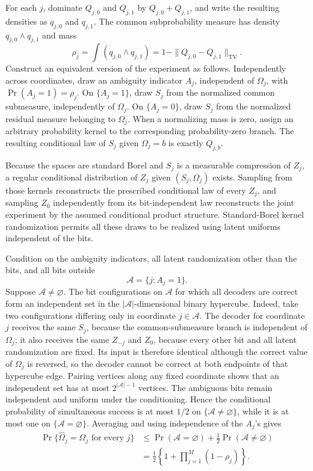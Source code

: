 For each \(j\), dominate \(Q_{j,0}\) and \(Q_{j,1}\) by \(Q_{j,0}+Q_{j,1}\), and write the resulting densities as \(q_{j,0}\) and \(q_{j,1}\).  The common subprobability measure has density \(q_{j,0}\wedge q_{j,1}\) and mass
\[
 \rho_j=\int(q_{j,0}\wedge q_{j,1})
 =1-\|Q_{j,0}-Q_{j,1}\|_{\mathrm{TV}}.
\]
Construct an equivalent version of the experiment as follows.  Independently across coordinates, draw an ambiguity indicator \(A_j\), independent of \(\Omega_j\), with \(\Pr(A_j=1)=\rho_j\).  On \(\{A_j=1\}\), draw \(S_j\) from the normalized common submeasure, independently of \(\Omega_j\).  On \(\{A_j=0\}\), draw \(S_j\) from the normalized residual measure belonging to \(\Omega_j\).  When a normalizing mass is zero, assign an arbitrary probability kernel to the corresponding probability-zero branch.  The resulting conditional law of \(S_j\) given \(\Omega_j=b\) is exactly \(Q_{j,b}\).

Because the spaces are standard Borel and \(S_j\) is a measurable compression of \(Z_j\), a regular conditional distribution of \(Z_j\) given \((S_j,\Omega_j)\) exists.  Sampling from those kernels reconstructs the prescribed conditional law of every \(Z_j\), and sampling \(Z_0\) independently from its bit-independent law reconstructs the joint experiment by the assumed conditional product structure.  Standard-Borel kernel randomization permits all these draws to be realized using latent uniforms independent of the bits.

Condition on the ambiguity indicators, all latent randomization other than the bits, and all bits outside
\[
 \mathcal A=\{j:A_j=1\}.
\]
Suppose \(\mathcal A\neq\varnothing\).  The bit configurations on \(\mathcal A\) for which all decoders are correct form an independent set in the \(|\mathcal A|\)-dimensional binary hypercube.  Indeed, take two configurations differing only in coordinate \(j\in\mathcal A\).  The decoder for coordinate \(j\) receives the same \(S_j\), because the common-submeasure branch is independent of \(\Omega_j\); it also receives the same \(Z_{-j}\) and \(Z_0\), because every other bit and all latent randomization are fixed.  Its input is therefore identical although the correct value of \(\Omega_j\) is reversed, so the decoder cannot be correct at both endpoints of that hypercube edge.  Pairing vertices along any fixed coordinate shows that an independent set has at most \(2^{|\mathcal A|-1}\) vertices.  The ambiguous bits remain independent and uniform under the conditioning.  Hence the conditional probability of simultaneous success is at most \(1/2\) on \(\{\mathcal A\neq\varnothing\}\), while it is at most one on \(\{\mathcal A=\varnothing\}\).  Averaging and using independence of the \(A_j\)'s gives
\[
\begin{aligned}
 \Pr\{\widehat\Omega_j=\Omega_j\text{ for every }j\}
 &\leq \Pr(\mathcal A=\varnothing)+\frac12\Pr(\mathcal A\neq\varnothing)\\
 &=\frac12\left\{1+\prod_{j=1}^M(1-\rho_j)\right\}.
\end{aligned}
\]

